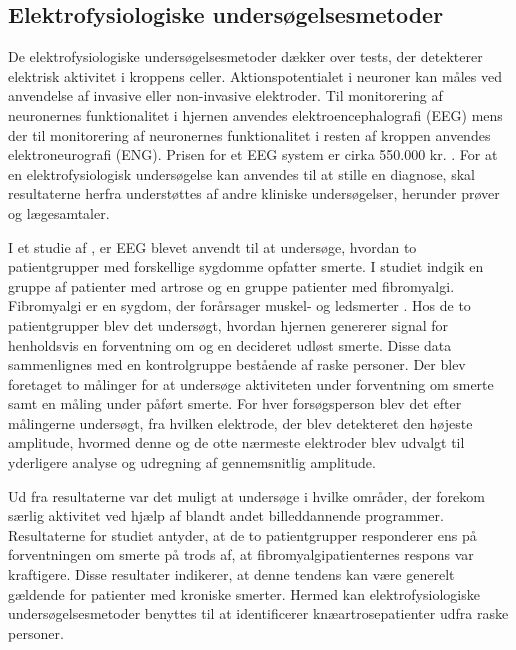 \subsection{Elektrofysiologiske undersøgelsesmetoder}
De elektrofysiologiske undersøgelsesmetoder dækker over tests, der detekterer elektrisk aktivitet i kroppens celler. Aktionspotentialet i neuroner kan måles ved anvendelse af invasive eller non-invasive elektroder. Til monitorering af neuronernes funktionalitet i hjernen anvendes elektroencephalografi (EEG) mens der til monitorering af neuronernes funktionalitet i resten af kroppen anvendes elektroneurografi (ENG). Prisen for et EEG system er cirka 550.000 kr. \citep{Biosemi2016}. For at en elektrofysiologisk undersøgelse kan anvendes til at stille en diagnose, skal resultaterne herfra understøttes af andre kliniske undersøgelser, herunder prøver og lægesamtaler. \citep{Robinson2008} 

I et studie af , er EEG blevet anvendt til at undersøge, hvordan to patientgrupper med forskellige sygdomme opfatter smerte. I studiet indgik en gruppe af patienter med artrose og en gruppe patienter med fibromyalgi. Fibromyalgi er en sygdom, der forårsager muskel- og ledsmerter \citep{Gigtforeningen2016}. Hos de to patientgrupper blev det undersøgt, hvordan hjernen genererer signal for henholdsvis en forventning om og en decideret udløst smerte. Disse data sammenlignes med en kontrolgruppe bestående af raske personer. Der blev foretaget to målinger for at undersøge aktiviteten under forventning om smerte samt en måling under påført smerte. For hver forsøgsperson blev det efter målingerne undersøgt, fra hvilken elektrode, der blev detekteret den højeste amplitude, hvormed denne og de otte nærmeste elektroder blev udvalgt til yderligere analyse og udregning af gennemsnitlig amplitude.

Ud fra resultaterne var det muligt at undersøge i hvilke områder, der forekom særlig aktivitet ved hjælp af blandt andet billeddannende programmer. Resultaterne for studiet antyder, at de to patientgrupper responderer ens på forventningen om smerte på trods af, at fibromyalgipatienternes respons var kraftigere. Disse resultater indikerer, at denne tendens kan være generelt gældende for patienter med kroniske smerter. Hermed kan elektrofysiologiske undersøgelsesmetoder benyttes til at identificerer knæartrosepatienter udfra raske personer. \citep{Brown2013} 

